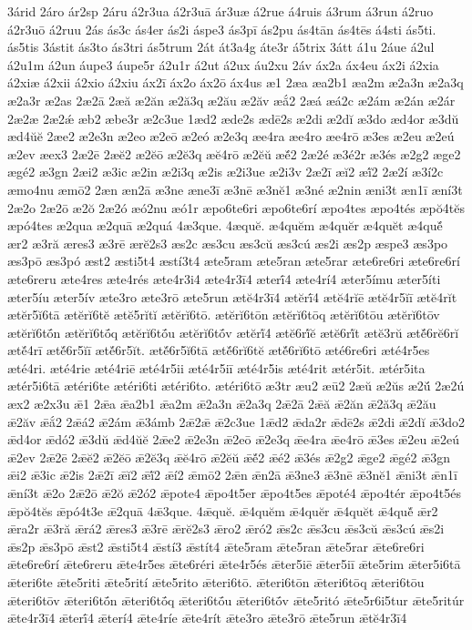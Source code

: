 {3árid
2áro
ár2sp
2áru
á2r3ua
á2r3uā
ár3uæ
á2rue
á4ruis
á3rum
á3run
á2ruo
á2r3uō
á2ruu
2ás
ás3c
ás4er
ás2i
áspe3
ás3pī
ás2pu
ás4tān
ás4tēs
á4sti
ás5ti.
ás5tis
3ástit
ás3to
ás3tri
ás5trum
2át
át3a4g
áte3r
á5trix
3átt
á1u
2áue
á2ul
á2u1m
á2un
áupe3
áupe5r
á2u1r
á2ut
á2ux
áu2xu
2áv
áx2a
áx4eu
áx2i
á2xia
á2xiæ
á2xii
á2xio
á2xiu
áx2ī
áx2o
áx2ō
áx4us
æ1
2æa
æa2b1
æa2m
æ2a3n
æ2a3q
æ2a3r
æ2as
2æ2ā
2æă
æ2ăn
æ2ă3q
æ2ău
æ2ăv
æắ2
2æá
æá2c
æ2ám
æ2án
æ2ár
2æ2æ
2æ2ǽ
æb2
æbe3r
æ2c3ue
1æd2
æde2s
ædē2s
æ2di
æ2dĭ
æ3do
æd4or
æ3dŭ
æd4ŭĕ
2æe2
æ2e3n
æ2eo
æ2eō
æ2eó
æ2e3q
æe4ra
æe4ro
æe4rō
æ3es
æ2eu
æ2eú
æ2ev
æex3
2æ2ē
2æĕ2
æ2ĕō
æ2ĕ3q
æĕ4rō
æ2ĕŭ
æĕ́2
2æ2é
æ3é2r
æ3és
æ2g2
æge2
ægé2
æ3gn
2æi2
æ3ic
æ2in
æ2i3q
æ2is
æ2i3ue
æ2i3v
2æ2ī
æĭ2
æĭ́2
2æ2í
æ3í2c
æmo4nu
æmō2
2æn
æn2ā
æ3ne
æne3ī
æ3nē
æ3nĕ1
æ3né
æ2nin
æni3t
æn1ī
æní3t
2æ2o
2æ2ō
æ2ŏ
2æ2ó
æó2nu
æó1r
æpo6te6ri
æpo6te6rí
æpo4tes
æpo4tés
æpŏ4tĕs
æpó4tes
æ2qua
æ2quā
æ2quá
4æ3que.
4æquĕ.
æ4quĕm
æ4quĕr
æ4quĕt
æ4quĕ́
ær2
æ3ră
æres3
æ3rē
ærĕ2s3
æs2c
æs3cu
æs3cŭ
æs3cú
æs2i
æs2p
æspe3
æs3po
æs3pō
æs3pó
æst2
æsti5t4
æstí3t4
æte5ram
æte5ran
æte5rar
æte6re6ri
æte6re6rí
æte6reru
æte4res
æte4rés
æte4r3i4
æte4r3ī4
æterī́4
æte4rí4
æter5ímu
æter5íti
æter5íu
æter5ív
æte3ro
æte3rō
æte5run
ætĕ4r3ī4
ætĕrī́4
ætĕ4rĭē
ætĕ4r5ĭī
ætĕ4rĭt
ætĕr5ĭ6tā
ætĕrĭ6tĕ
ætĕ5rĭtĭ
ætĕrĭ6tō.
ætĕrĭ6tōn
ætĕrĭ6tōq
ætĕrĭ6tōu
ætĕrĭ6tōv
ætĕrĭ6tṓn
ætĕrĭ6tṓq
ætĕrĭ6tṓu
ætĕrĭ6tṓv
ætĕrĭ́4
ætĕ6rĭ́ĕ
ætĕ6rĭ́t
ætĕ3rŭ
ætĕ́6rĕ6rĭ
ætĕ́4rī
ætĕ́6r5ĭī
ætĕ́6r5ĭt.
ætĕ́6r5ĭ6tā
ætĕ́6rĭ6tĕ
ætĕ́6rĭ6tō
æté6re6ri
æté4r5es
æté4ri.
æté4rie
æté4riē
æté4r5ii
æté4r5iī
æté4r5is
æté4rit
ætér5it.
ætér5ita
ætér5i6tā
ætéri6te
ætéri6ti
ætéri6to.
ætéri6tō
æ3tr
æu2
æū2
2æŭ
æ2ŭs
æ2ŭ́
2æ2ú
æx2
æ2x3u
ǣ1
2ǣa
ǣa2b1
ǣa2m
ǣ2a3n
ǣ2a3q
2ǣ2ā
2ǣă
ǣ2ăn
ǣ2ă3q
ǣ2ău
ǣ2ăv
ǣắ2
2ǣá2
ǣ2ám
ǣ3ámb
2ǣ2ǣ
ǣ2c3ue
1ǣd2
ǣda2r
ǣdē2s
ǣ2di
ǣ2dĭ
ǣ3do2
ǣd4or
ǣdó2
ǣ3dŭ
ǣd4ŭĕ
2ǣe2
ǣ2e3n
ǣ2eō
ǣ2e3q
ǣe4ra
ǣe4rō
ǣ3es
ǣ2eu
ǣ2eú
ǣ2ev
2ǣ2ē
2ǣĕ2
ǣ2ĕō
ǣ2ĕ3q
ǣĕ4rō
ǣ2ĕŭ
ǣĕ́2
ǣé2
ǣ3és
ǣ2g2
ǣge2
ǣgé2
ǣ3gn
ǣi2
ǣ3ic
ǣ2is
2ǣ2ī
ǣĭ2
ǣĭ́2
ǣí2
ǣmō2
2ǣn
ǣn2ā
ǣ3ne3
ǣ3nē
ǣ3nĕ1
ǣni3t
ǣn1ī
ǣní3t
ǣ2o
2ǣ2ō
ǣ2ŏ
ǣ2ó2
ǣpote4
ǣpo4t5er
ǣpo4t5es
ǣpoté4
ǣpo4tér
ǣpo4t5és
ǣpŏ4tĕs
ǣpó4t3e
ǣ2quā
4ǣ3que.
4ǣquĕ.
ǣ4quĕm
ǣ4quĕr
ǣ4quĕt
ǣ4quĕ́
ǣr2
ǣra2r
ǣ3ră
ǣrá2
ǣres3
ǣ3rē
ǣrĕ2s3
ǣro2
ǣró2
ǣs2c
ǣs3cu
ǣs3cŭ
ǣs3cú
ǣs2i
ǣs2p
ǣs3pō
ǣst2
ǣsti5t4
ǣstí3
ǣstít4
ǣte5ram
ǣte5ran
ǣte5rar
ǣte6re6ri
ǣte6re6rí
ǣte6reru
ǣte4r5es
ǣte6réri
ǣte4r5és
ǣter5iē
ǣter5iī
ǣte5rim
ǣter5i6tā
ǣteri6te
ǣte5riti
ǣte5rití
ǣte5rito
ǣteri6tō.
ǣteri6tōn
ǣteri6tōq
ǣteri6tōu
ǣteri6tōv
ǣteri6tṓn
ǣteri6tṓq
ǣteri6tṓu
ǣteri6tṓv
ǣte5ritó
ǣte5r6i5tur
ǣte5ritúr
ǣte4r3ī4
ǣterī́4
ǣterí4
ǣte4ríe
ǣte4rít
ǣte3ro
ǣte3rō
ǣte5run
ǣtĕ4r3ī4
}
